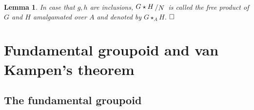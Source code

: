 \documentclass[11pt]{book}
\numberwithin{dummy}{section}
\newtheorem{lemma}[theorem]{Lemma}
\theoremstyle{nonumberbreak}
\newenvironment{pr}[1][]{\ifthenelse{\equal{#1}{}}{\proof}{\proof[#1]}\rm}{\endproof}
\newcommand{\slant}[2]{{\raisebox{.1em}{$#1$}\left/\raisebox{-.1em}{$#2$}\right.}}
\begin{document}
\begin{spacing}{1.4}
\begin{lemma}
\begin{pr}
In case that $g,h$ are inclusions, $\slant{G \star H}{N}$ is called the \textit{free product of} $G$ \textit{and} $H$ \textit{amalgamated over} $A$ and denoted by $G \star_A H$. $\hfill \Box$
\end{pr}

\end{lemma}



\newpage 
\thispagestyle{empty}















\chapter{Fundamental groupoid and van Kampen's theorem} %
\setlength\abovedisplayshortskip{0pt}
\setlength\belowdisplayshortskip{10pt}
\setlength\abovedisplayskip{10pt}
\setlength\belowdisplayskip{10pt}



\section{The fundamental groupoid} %

\thispagestyle{empty}




\end{spacing}
\end{document}
